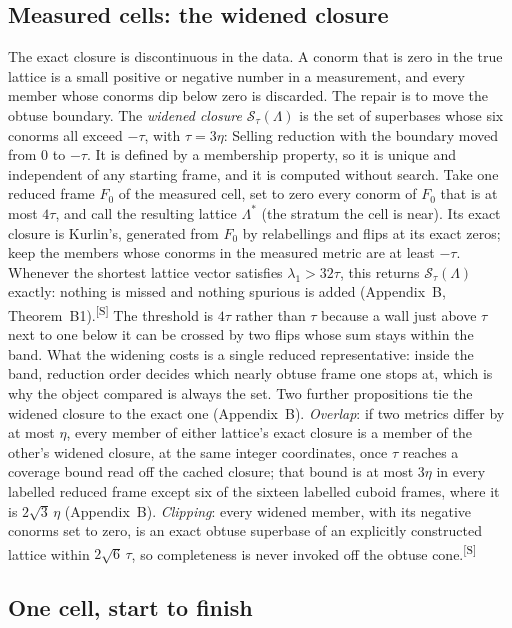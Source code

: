 \documentclass[preprint,pdf]{iucr}          %
\makeatletter
\newcommand{\Sclosure}{\mathcal{S}}
\newcommand{\chk}[1]{\textsuperscript{[S\@nameuse{zn@#1}]}}
\makeatother
\begin{document}
\subsection{Measured cells: the widened closure}
\label{sec:widening}

The exact closure is discontinuous in the data. A conorm that is zero in the true lattice is a small positive or negative number in a measurement, and every member whose conorms dip below zero is discarded. The repair is to move the obtuse boundary. The \emph{widened closure} $\Sclosure_\tau(\Lambda)$ is the set of superbases whose six conorms all exceed $-\tau$, with $\tau=3\eta$: Selling reduction with the boundary moved from $0$ to $-\tau$. It is defined by a membership property, so it is unique and independent of any starting frame, and it is computed without search. Take one reduced frame $F_0$ of the measured cell, set to zero every conorm of $F_0$ that is at most $4\tau$, and call the resulting lattice $\Lambda^*$ (the stratum the cell is near). Its exact closure is Kurlin's, generated from $F_0$ by relabellings and flips at its exact zeros; keep the members whose conorms in the measured metric are at least $-\tau$. Whenever the shortest lattice vector satisfies $\lambda_1>32\tau$, this returns $\Sclosure_\tau(\Lambda)$ exactly: nothing is missed and nothing spurious is added (Appendix~B, Theorem~B1).\chk{z:widened-complete} The threshold is $4\tau$ rather than $\tau$ because a wall just above $\tau$ next to one below it can be crossed by two flips whose sum stays within the band. What the widening costs is a single reduced representative: inside the band, reduction order decides which nearly obtuse frame one stops at, which is why the object compared is always the set. Two further propositions tie the widened closure to the exact one (Appendix~B). \emph{Overlap}: if two metrics differ by at most $\eta$, every member of either lattice's exact closure is a member of the other's widened closure, at the same integer coordinates, once $\tau$ reaches a coverage bound read off the cached closure; that bound is at most $3\eta$ in every labelled reduced frame except six of the sixteen labelled cuboid frames, where it is $2\sqrt3\,\eta$ (Appendix~B). \emph{Clipping}: every widened member, with its negative conorms set to zero, is an exact obtuse superbase of an explicitly constructed lattice within $2\sqrt6\,\tau$, so completeness is never invoked off the obtuse cone.\chk{z:overlap}

\subsection{One cell, start to finish}
\label{sec:thread}
\end{document}
